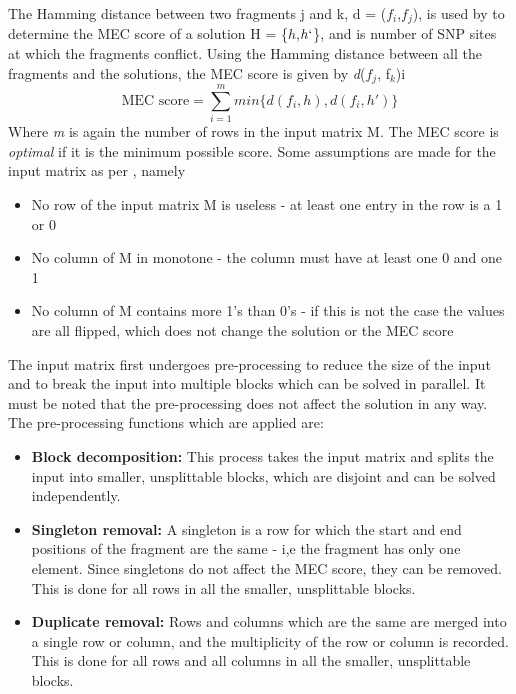 \documentclass[10pt,twocolumn]{article}
\newcommand{\M}{\textit{m }}
\newcommand{\D}{\textit{d}}
\begin{document}
The Hamming distance between two fragments j and k, d = ($f_i$,$f_j$), is used by \cite{chen:2013} to 
determine the MEC score of a solution H = \{$h$,$h`$\}, and is number of SNP sites at which the fragments 
conflict. Using the Hamming distance between all the fragments and the solutions, the MEC score is given by
\D($f_j$, f$_k$)i
\begin{equation}
\textrm{MEC score} = \sum_{i = 1}^{m}{ min\{\D(f_i, h), \D(f_i, h')\} }
\end{equation}
Where \M is again the number of rows in the input matrix M. The MEC score is \textit{optimal} if it is the
minimum possible score. Some assumptions are made for the input matrix as per \cite{chen:2013}, namely
\begin{itemize}[noitemsep]
\item{ No row of the input matrix M is useless - at least one entry in the row is a 1 or 0 
}
\item{ No column of M in monotone - the column must have at least one 0 and one 1
}
\item{ No column of M contains more 1's than 0's - if this is not the case the values are all flipped, which
    does not change the solution or the MEC score
}
\end{itemize}
The input matrix first undergoes pre-processing to reduce the size of the input and to break the input into
multiple blocks which can be solved in parallel. It must be noted that the pre-processing does not affect 
the solution in any way. The pre-processing functions which are applied are:
\begin{itemize}[noitemsep]
\item{ \textbf{Block decomposition:} This process takes the input matrix and splits the input into smaller,
        unsplittable blocks, which are disjoint and can be solved independently.
}
\item{ \textbf{Singleton removal:} A singleton is a row for which the start and end positions of the fragment
    are the same - i,e the fragment has only one element. Since singletons do not affect the MEC score,
    they can be removed. This is done for all rows in all the smaller, unsplittable blocks.
}
\item{ \textbf{Duplicate removal:} Rows and columns which are the same are merged into a single row or column, 
        and the multiplicity of the row or column is recorded. This is done for all rows and all columns in
        all the smaller, unsplittable blocks.
}
\end{itemize}
\end{document}
